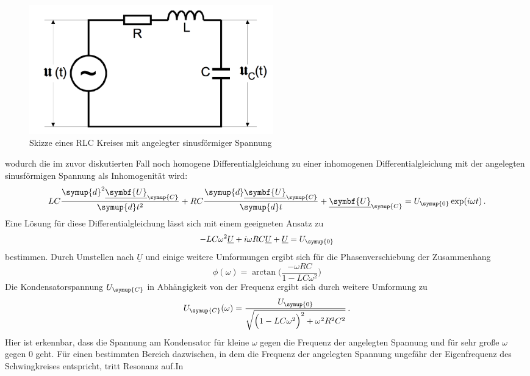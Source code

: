 \begin{figure}
  \centering
  \includegraphics[width=300pt]{data/angeregter_schwingkreis_theorie.png}
  \caption{Skizze eines RLC Kreises mit angelegter sinusförmiger Spannung
  \cite{Versuchsanleitung1}}
  \label{fig:RLC_sinus}
\end{figure}
wodurch die im zuvor diskutierten Fall noch homogene Differentialgleichung zu einer
inhomogenen Differentialgleichung mit der angelegten sinusförmigen Spannung
als Inhomogenität wird:
\begin{equation}
  LC\frac{\symup{d}^2\underline{\symbf{U}}_{\symup{C}}}{\symup{d}t^2}
  +RC\frac{\symup{d}\underline{\symbf{U}}_{\symup{C}}}{\symup{d}t}
  +\underline{\symbf{U}}_{\symup{C}} = U_{\symup{0}}\exp(i\omega t) \,.
\end{equation}
Eine Lösung für diese Differentialgleichung lässt sich mit einem geeigneten Ansatz
zu
\begin{equation}
  -LC\omega^2\underline{U}+i\omega R C\underline{U}+\underline{U}=U_{\symup{0}}
\end{equation}
bestimmen. Durch Umstellen nach $\underline{U}$ und einige weitere Umformungen ergibt
sich für die Phasenverschiebung der Zusammenhang
\begin{equation}
  \phi(\omega)=\arctan\biggl(\frac{-\omega R C}{1-L C \omega^2}\biggr)
\end{equation}
Die Kondensatorspannung $U_{\symup{C}}$ in Abhängigkeit von der Frequenz ergibt sich
durch weitere Umformung zu
\begin{equation}
  U_{\symup{C}}(\omega)=\frac{U_{\symup{0}}}{\sqrt{\Bigl(1-LC\omega^2\Bigr)^2+\omega^2 R^2 C^2}} \,.
\end{equation}
Hier ist erkennbar, dass die Spannung am Kondensator für kleine $\omega$ gegen
die Frequenz der angelegten Spannung und für sehr große $\omega$ gegen $0$ geht.
Für einen bestimmten Bereich dazwischen, in dem die Frequenz der angelegten Spannung
ungefähr der Eigenfrequenz des Schwingkreises entspricht, tritt Resonanz auf.In

